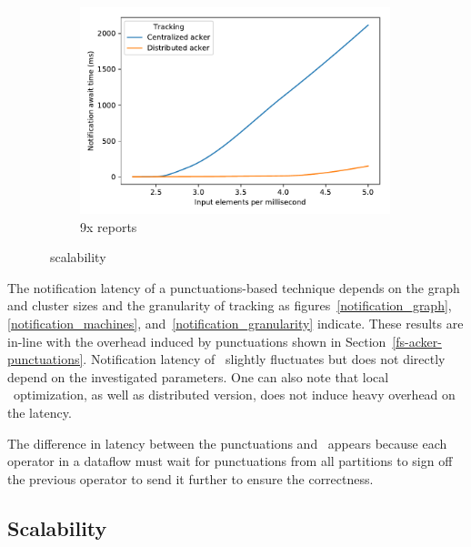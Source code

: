 \begin{figure}[t!]
\begin{subfigure}[b]{0.30\textwidth}
            \includegraphics[width=0.99\textwidth]{pics/scalability_09x.pdf}
            \caption{9x reports}
            \label{9x_acks}
    \end{subfigure}
    \caption{\tracker\ scalability}
    \label{notification_scalability}
\end{figure}

The notification latency of a punctuations-based technique depends on the graph and cluster sizes and the granularity of tracking as figures~\ref{notification_graph},\ref{notification_machines}, and~\ref{notification_granularity} indicate. These results are in-line with the overhead induced by punctuations shown in Section~\ref{fs-acker-punctuations}. Notification latency of \tracker\ slightly fluctuates but does not directly depend on the investigated parameters. One can also note that local \tracker\ optimization, as well as distributed version, does not induce heavy overhead on the latency.

The difference in latency between the punctuations and \tracker\ appears because each operator in a dataflow must wait for punctuations from all partitions to sign off the previous operator to send it further to ensure the correctness. 


\subsection{Scalability}

